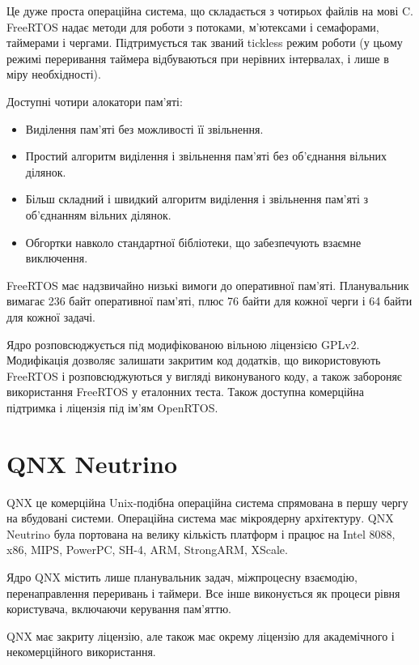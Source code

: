 \documentclass[oneside,14pt,a4paper,final]{myextreport}
\begin{document}
Це дуже проста операційна система, що складається з чотирьох файлів на мові C. FreeRTOS надає методи для роботи з потоками, м'ютексами і семафорами, таймерами і чергами. Підтримується так званий tickless режим роботи (у цьому режимі переривання таймера відбуваються при нерівних інтервалах, і лише в міру необхідності).

Доступні чотири алокатори пам'яті:
\begin{itemize}
  \item Виділення пам'яті без можливості її звільнення.
  \item Простий алгоритм виділення і звільнення пам'яті без об'єднання вільних ділянок.
  \item Більш складний і швидкий алгоритм виділення і звільнення пам'яті з об'єднанням вільних ділянок.
  \item Обгортки навколо стандартної бібліотеки, що забезпечують взаємне виключення.
\end{itemize}

FreeRTOS має надзвичайно низькі вимоги до оперативної пам'яті. Планувальник вимагає 236 байт оперативної пам'яті, плюс 76 байти для кожної черги і 64 байти для кожної задачі.

Ядро розповсюджується під модифікованою вільною ліцензією GPLv2\cite{freertos:license}. Модифікація дозволяє залишати закритим код додатків, що використовують FreeRTOS і розповсюджуються у вигляді виконуваного коду, а також забороняє використання FreeRTOS у еталонних теста. Також доступна комерційна підтримка і ліцензія під ім'ям OpenRTOS\cite{openrtos}.

\section{QNX Neutrino}

QNX\cite{qnx} це комерційна Unix-подібна операційна система спрямована в першу чергу на вбудовані системи. Операційна система має мікроядерну архітектуру. QNX Neutrino була портована на велику кількість платформ і працює на Intel 8088, x86, MIPS, PowerPC, SH-4, ARM, StrongARM, XScale.

Ядро QNX містить лише планувальник задач, міжпроцесну взаємодію, перенаправлення переривань і таймери. Все інше виконується як процеси рівня користувача, включаючи керування пам'яттю.

QNX має закриту ліцензію, але також має окрему ліцензію для академічного і некомерційного використання\cite{qnx:noncommercial}.
\end{document}
